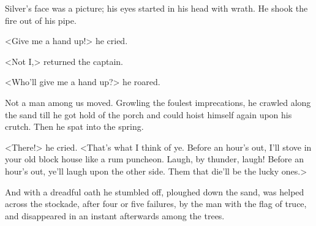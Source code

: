 Silver's face was a picture; his eyes started in his head with wrath. He shook the fire out of his pipe.

<Give me a hand up!> he cried.

<Not I,> returned the captain.

<Who'll give me a hand up?> he roared.

Not a man among us moved. Growling the foulest imprecations, he crawled along the sand till he got hold of the porch and could hoist himself again upon his crutch. Then he spat into the spring.

<There!> he cried. <That's what I think of ye. Before an hour's out, I'll stove in your old block house like a rum puncheon. Laugh, by thunder, laugh! Before an hour's out, ye'll laugh upon the other side. Them that die'll be the lucky ones.>

And with a dreadful oath he stumbled off, ploughed down the sand, was helped across the stockade, after four or five failures, by the man with the flag of truce, and disappeared in an instant afterwards among the trees.